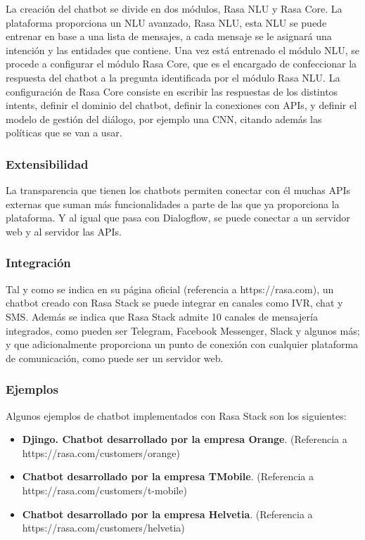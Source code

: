 La creación del chatbot se divide en dos módulos, Rasa NLU y Rasa Core. La plataforma proporciona un NLU avanzado, Rasa NLU, esta NLU se puede entrenar en base a una lista de mensajes, a cada mensaje se le asignará una intención y las entidades que contiene. Una vez está entrenado el módulo NLU, se procede a configurar el módulo Rasa Core, que es el encargado de confeccionar la respuesta del chatbot a la pregunta identificada por el módulo Rasa NLU. La configuración de Rasa Core consiste en escribir las respuestas de los distintos intents, definir el dominio del chatbot, definir la conexiones con APIs, y definir el modelo de gestión del diálogo, por ejemplo una CNN, citando además las políticas que se van a usar.

\subsubsection*{Extensibilidad}

La transparencia que tienen los chatbots permiten conectar con él muchas APIs externas que suman más funcionalidades a parte de las que ya proporciona la plataforma. Y al igual que pasa con Dialogflow, se puede conectar a un servidor web y al servidor las APIs.

\subsubsection*{Integración}

Tal y como se indica en su página oficial (referencia a https://rasa.com), un chatbot creado con Rasa Stack se puede integrar en canales como IVR, chat y SMS. Además se indica que Rasa Stack admite 10 canales de mensajería integrados, como pueden ser Telegram, Facebook Messenger, Slack y algunos más; y que adicionalmente proporciona un punto de conexión con cualquier plataforma de comunicación, como puede ser un servidor web.

\subsubsection*{Ejemplos}

Algunos ejemplos de chatbot implementados con Rasa Stack son los siguientes:

\begin{itemize}
    \item \textbf{Djingo. Chatbot desarrollado por la empresa Orange}. (Referencia a https://rasa.com/customers/orange)
    \item \textbf{Chatbot desarrollado por la empresa TMobile}. (Referencia a https://rasa.com/customers/t-mobile)
    \item \textbf{Chatbot desarrollado por la empresa Helvetia}. (Referencia a https://rasa.com/customers/helvetia)
\end{itemize}




